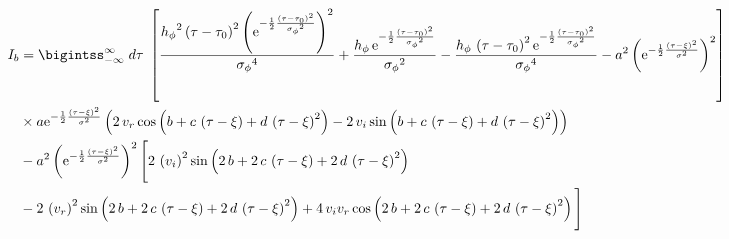 \begin{align}
I_b & = \bigintss_{-\infty}^{\infty} \; d\tau\; \left[ \frac{{{ h_{\phi}}}^{2} \left( \tau-{ \tau_0} \right) ^{2} \left( {
{\rm e}^{-\frac{1}{2}{\frac { \left( \tau-{ \tau_0} \right) ^{2}}{{{ 
\sigma_{\phi}}}^{2}}}}} \right) ^{2}}{{{ \sigma_{\phi}}}^{4}}+\frac{{ h_{\phi}}
\,{{\rm e}^{-\frac{1}{2}{\frac { \left( \tau-{ \tau_0} \right) ^{2}}{{{ 
\sigma_{\phi}}}^{2}}}}}}{{{ \sigma_{\phi}}}^{2}}-\frac{{ h_{\phi}}\, \left( \tau-{
 \tau_0} \right) ^{2}{{\rm e}^{-\frac{1}{2}{\frac { \left( \tau-{ \tau_0}
 \right) ^{2}}{{{ \sigma_{\phi}}}^{2}}}}}}{{{ \sigma_{\phi}}}^{4}}-{a}^{
2} \left( {{\rm e}^{-\frac{1}{2}{\frac { \left( \tau-\xi \right) ^{2}}{{
\sigma}^{2}}}}} \right) ^{2} \right] \nonumber \\
& \times a{{\rm e}^{-\frac{1}{2}{\frac { \left( 
\tau-\xi \right) ^{2}}{{\sigma}^{2}}}}} \left( 2\, v_r \cos \left( b+c\, \left( \tau-\xi \right) +d\,
 \left( \tau-\xi \right) ^{2} \right) -2\,v_i \sin \left( b+c\, \left( \tau-\xi \right) +d\, \left( \tau-{
 \xi} \right) ^{2} \right)  \right) \nonumber \\
 & -{a}^{2} \left( {{\rm e}^{-\frac{1}{2}
{\frac { \left( \tau-\xi \right) ^{2}}{{\sigma}^{2}}}}} \right) ^{2}
 \Bigg[ 2\, \left( v_i  \right) ^{2}
\sin \left( 2\,b+2\,c\, \left( \tau-\xi \right) +2\,d\, \left( \tau-{
 \xi} \right) ^{2} \right) \nonumber \\
 &-2\, \left( v_r  \right) ^{2}\sin \left( 2\,b+2\,c\, \left( \tau-\xi
 \right) +2\,d\, \left( \tau-\xi \right) ^{2} \right) +4\,v_i v_r\cos
 \left( 2\,b+2\,c\, \left( \tau-\xi \right) +2\,d\, \left( \tau-{ \xi
} \right) ^{2} \right)  \Bigg]
\end{align}

